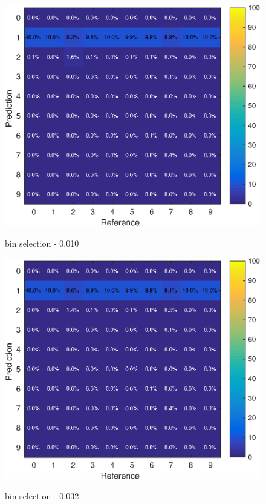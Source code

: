 \documentclass[10pt,a4paper]{article}
\begin{document}
\begin{figure}[!htb]
  \includegraphics[width=\linewidth]{confus_10.eps}
\label{fig:awesome_image1}
\caption{bin selection - 0.010}
\endminipage\hfill
{}
  \includegraphics[width=\linewidth]{confus_32.eps}
\label{fig:awesome_image2}
\caption{bin selection - 0.032}
\endminipage\hfill
{}%

\end{figure}
\end{document}

